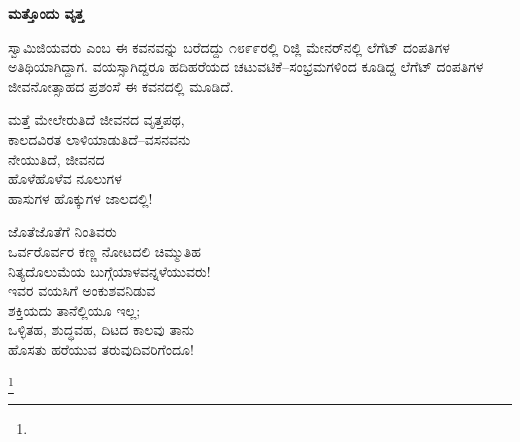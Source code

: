 \begin{myquote}
\end{myquote}

\begin{myquote}
\end{myquote}

\begin{center}
\textbf{ಮತ್ತೊಂದು ವೃತ್ತ}
\end{center}

ಸ್ವಾಮಿಜಿಯವರು  ಎಂಬ ಈ ಕವನವನ್ನು ಬರೆದದ್ದು ೧೮೯೯ರಲ್ಲಿ ರಿಜ್ಲಿ ಮೇನರ್‌ನಲ್ಲಿ ಲೆಗೆಟ್ ದಂಪತಿಗಳ ಅತಿಥಿಯಾಗಿದ್ದಾಗ. ವಯಸ್ಸಾಗಿದ್ದರೂ ಹದಿಹರೆಯದ ಚಟುವಟಿಕೆ–ಸಂಭ್ರಮಗಳಿಂದ ಕೂಡಿದ್ದ ಲೆಗೆಟ್ ದಂಪತಿಗಳ ಜೀವನೋತ್ಸಾಹದ ಪ್ರಶಂಸೆ ಈ ಕವನದಲ್ಲಿ ಮೂಡಿದೆ.

\begin{myquote}
ಮತ್ತೆ ಮೇಲೇರುತಿದೆ ಜೀವನದ ವೃತ್ತಪಥ,\\ಕಾಲದವಿರತ ಲಾಳಿಯಾಡುತಿದೆ–ವಸನವನು\\ನೇಯುತಿದೆ, ಜೀವನದ\\ಹೊಳೆಹೊಳೆವ ನೂಲುಗಳ\\ಹಾಸುಗಳ ಹೊಕ್ಕುಗಳ ಜಾಲದಲ್ಲಿ!
\end{myquote}

\begin{myquote}
ಜೊತೆಜೊತೆಗೆ ನಿಂತಿವರು\\ಒರ್ವರೊರ್ವರ ಕಣ್ಣ ನೋಟದಲಿ ಚಿಮ್ಮುತಿಹ\\ನಿತ್ಯದೊಲುಮೆಯ ಬುಗ್ಗೆಯಾಳವನ್ನಳೆಯುವರು!\\ಇವರ ವಯಸಿಗೆ ಅಂಕುಶವನಿಡುವ\\ಶಕ್ತಿಯದು ತಾನೆಲ್ಲಿಯೂ ಇಲ್ಲ;\\ಒಳ್ಳಿತಹ, ಶುದ್ಧವಹ, ದಿಟದ ಕಾಲವು ತಾನು\\ಹೊಸತು ಹರೆಯುವ ತರುವುದಿವರಿಗೆಂದೂ!
\end{myquote}

\protect\footnote{}

\begin{myquote}
\end{myquote}

